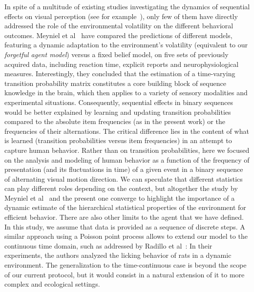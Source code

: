 \documentclass[10pt,letterpaper]{article}
\newcommand{\citet}[1]{\cite{#1}}
\begin{document}
In spite of a multitude of existing studies investigating the dynamics of sequential effects on visual perception (see for example~\citet{Cicchini_PRSB_2018,ChopinMamassian2012}), only few of them have directly addressed the role of the environmental volatility on the different behavioral outcomes. Meyniel et al~\citet{Meyniel16} have compared the predictions of different models, featuring a dynamic adaptation to the environment's volatility (equivalent to our \textit{forgetful agent model}) versus a fixed belief model, on five sets of previously acquired data, including reaction time, explicit reports and neurophysiological measures. Interestingly, they concluded that the estimation of a time-varying transition probability matrix constitutes a core building block of sequence knowledge in the brain,
which then applies to a variety of sensory modalities and experimental situations. Consequently, sequential effects in binary sequences would be better explained by learning and updating transition probabilities compared to the absolute item frequencies (as in the present work) or the frequencies of their alternations. The critical difference lies in the content of what is learned (transition probabilities versus item frequencies) in an attempt to capture human behavior. Rather than on transition probabilities, here we focused on the analysis and modeling of human behavior as a function of the frequency of presentation (and its fluctuations in time) of a given event in a binary sequence of alternating visual motion direction. We can speculate that different statistics can play different roles depending on the context, but altogether the study by Meyniel et al~\citet{Meyniel16} and the present one converge to highlight the importance of a dynamic estimate of the hierarchical statistical properties of the environment for efficient behavior. There are also other limits to the agent that we have defined. In this study, we assume that data is provided as a sequence of discrete steps. A similar approach using a Poisson point process
allows to extend our model to the continuous time domain, such as addressed by Radillo et al~\citet{RadilloBrady2017}: In their experiments, the authors analyzed the licking behavior of rats in a dynamic environment. The generalization to the time-continuous case is beyond the scope of our current protocol, but it would consist in a natural extension of it to more complex and ecological settings.
\end{document}
